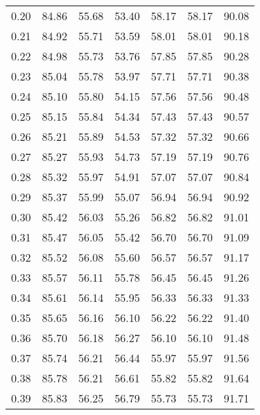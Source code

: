 \begin{tabular}{|c|c|c|c|c|c|c|}
      0.20 &     84.86 &     55.68 &      53.40 &   58.17 &      58.17 &         90.08 \\
      0.21 &     84.92 &     55.71 &      53.59 &   58.01 &      58.01 &         90.18 \\
      0.22 &     84.98 &     55.73 &      53.76 &   57.85 &      57.85 &         90.28 \\
      0.23 &     85.04 &     55.78 &      53.97 &   57.71 &      57.71 &         90.38 \\
      0.24 &     85.10 &     55.80 &      54.15 &   57.56 &      57.56 &         90.48 \\
      0.25 &     85.15 &     55.84 &      54.34 &   57.43 &      57.43 &         90.57 \\
      0.26 &     85.21 &     55.89 &      54.53 &   57.32 &      57.32 &         90.66 \\
      0.27 &     85.27 &     55.93 &      54.73 &   57.19 &      57.19 &         90.76 \\
      0.28 &     85.32 &     55.97 &      54.91 &   57.07 &      57.07 &         90.84 \\
      0.29 &     85.37 &     55.99 &      55.07 &   56.94 &      56.94 &         90.92 \\
      0.30 &     85.42 &     56.03 &      55.26 &   56.82 &      56.82 &         91.01 \\
      0.31 &     85.47 &     56.05 &      55.42 &   56.70 &      56.70 &         91.09 \\
      0.32 &     85.52 &     56.08 &      55.60 &   56.57 &      56.57 &         91.17 \\
      0.33 &     85.57 &     56.11 &      55.78 &   56.45 &      56.45 &         91.26 \\
      0.34 &     85.61 &     56.14 &      55.95 &   56.33 &      56.33 &         91.33 \\
      0.35 &     85.65 &     56.16 &      56.10 &   56.22 &      56.22 &         91.40 \\
      0.36 &     85.70 &     56.18 &      56.27 &   56.10 &      56.10 &         91.48 \\
      0.37 &     85.74 &     56.21 &      56.44 &   55.97 &      55.97 &         91.56 \\
      0.38 &     85.78 &     56.21 &      56.61 &   55.82 &      55.82 &         91.64 \\
      0.39 &     85.83 &     56.25 &      56.79 &   55.73 &      55.73 &         91.71 \\

\end{tabular}
